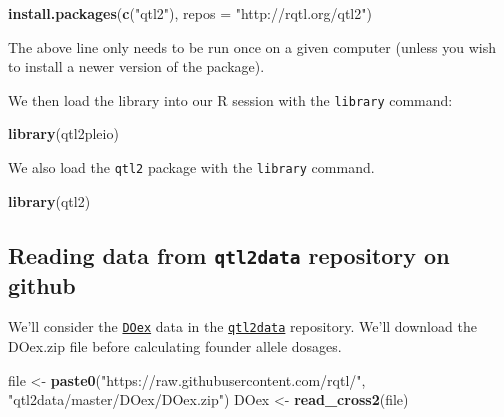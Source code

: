 \documentclass[oneside]{book}\usepackage[]{graphicx}\usepackage[]{color}
\newenvironment{Shaded}{\begin{snugshade}}{\end{snugshade}}
\newcommand{\DataTypeTok}[1]{\textcolor[rgb]{0.13,0.29,0.53}{#1}}
\newcommand{\KeywordTok}[1]{\textcolor[rgb]{0.13,0.29,0.53}{\textbf{#1}}}
\newcommand{\NormalTok}[1]{#1}
\newcommand{\StringTok}[1]{\textcolor[rgb]{0.31,0.60,0.02}{#1}}
\begin{document}
\begin{Shaded}
\begin{Highlighting}[]
\KeywordTok{install.packages}\NormalTok{(}\KeywordTok{c}\NormalTok{(}\StringTok{"qtl2"}\NormalTok{), }\DataTypeTok{repos =} \StringTok{"http://rqtl.org/qtl2"}\NormalTok{)}
\end{Highlighting}
\end{Shaded}

The above line only needs to be run once on a given computer (unless you
wish to install a newer version of the package).

We then load the library into our R session with the \texttt{library}
command:

\begin{Shaded}
\begin{Highlighting}[]
\KeywordTok{library}\NormalTok{(qtl2pleio)}
\end{Highlighting}
\end{Shaded}

We also load the \texttt{qtl2} package with the \texttt{library}
command.

\begin{Shaded}
\begin{Highlighting}[]
\KeywordTok{library}\NormalTok{(qtl2)}
\end{Highlighting}
\end{Shaded}

\hypertarget{reading-data-from-qtl2data-repository-on-github}{%
\subsection{\texorpdfstring{Reading data from \texttt{qtl2data}
repository on
github}{Reading data from qtl2data repository on github}}\label{reading-data-from-qtl2data-repository-on-github}}

We'll consider the
\href{https://github.com/rqtl/qtl2data/tree/master/DOex}{\texttt{DOex}}
data in the \href{https://github.com/rqtl/qtl2data}{\texttt{qtl2data}}
repository. We'll download the DOex.zip file before calculating founder
allele dosages.

\begin{Shaded}
\begin{Highlighting}[]
\NormalTok{file <-}\StringTok{ }\KeywordTok{paste0}\NormalTok{(}\StringTok{"https://raw.githubusercontent.com/rqtl/"}\NormalTok{, }\StringTok{"qtl2data/master/DOex/DOex.zip"}\NormalTok{)}
\NormalTok{DOex <-}\StringTok{ }\KeywordTok{read_cross2}\NormalTok{(file)}
\end{Highlighting}
\end{Shaded}
\end{document}
